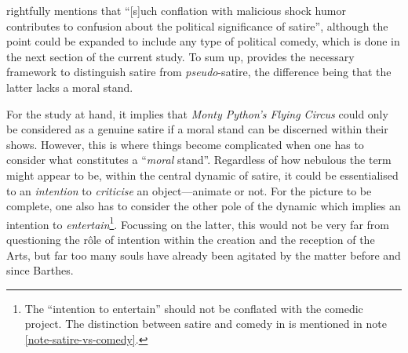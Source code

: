 \documentclass[
,a4paper
,DIV=12
,12pt
,abstract
,bibliography=totoc
]{scrartcl}
\begin{document}
\textcite[322]{declercq2018} rightfully mentions that \enquote{[s]uch conflation with malicious shock humor contributes to confusion about the political significance of satire}, although the point could be expanded to include any type of political comedy, which is done in the next section of the current study.  To sum up, \textcite{declercq2018} provides the necessary framework to distinguish satire from \emph{pseudo}-satire, the difference being that the latter lacks a moral stand.

For the study at hand, it implies that \emph{Monty Python’s Flying Circus} could only be considered as a genuine satire if a moral stand can be discerned within their shows.  However, this is where things become complicated when one has to consider what constitutes a \enquote{\emph{moral} stand}.  Regardless of how nebulous the term might appear to be, within the central dynamic of satire, it could be essentialised to an \emph{intention} to \emph{criticise} an object---animate or not.  For the picture to be complete, one also has to consider the other pole of the dynamic which implies an intention to \emph{entertain}\footnote{The \enquote{intention to entertain} should not be conflated with the comedic project.  The distinction between satire and comedy in \textcite{declercq2018} is mentioned in note \ref{note-satire-vs-comedy}.}.  Focussing on the latter, this would not be very far from questioning the rôle of intention within the creation and the reception of the Arts, but far too many souls have already been agitated by the matter before and since Barthes.
\end{document}

